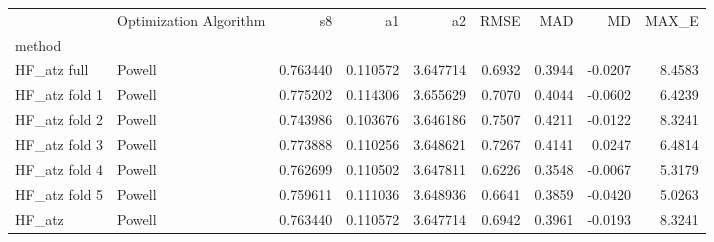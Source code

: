 \begin{tabular}{llrrrrrrr}
 & Optimization Algorithm & s8 & a1 & a2 & RMSE & MAD & MD & MAX_E \\
method &  &  &  &  &  &  &  &  \\
HF_atz full & Powell & 0.763440 & 0.110572 & 3.647714 & 0.6932 & 0.3944 & -0.0207 & 8.4583 \\
HF_atz fold 1 & Powell & 0.775202 & 0.114306 & 3.655629 & 0.7070 & 0.4044 & -0.0602 & 6.4239 \\
HF_atz fold 2 & Powell & 0.743986 & 0.103676 & 3.646186 & 0.7507 & 0.4211 & -0.0122 & 8.3241 \\
HF_atz fold 3 & Powell & 0.773888 & 0.110256 & 3.648621 & 0.7267 & 0.4141 & 0.0247 & 6.4814 \\
HF_atz fold 4 & Powell & 0.762699 & 0.110502 & 3.647811 & 0.6226 & 0.3548 & -0.0067 & 5.3179 \\
HF_atz fold 5 & Powell & 0.759611 & 0.111036 & 3.648936 & 0.6641 & 0.3859 & -0.0420 & 5.0263 \\
HF_atz & Powell & 0.763440 & 0.110572 & 3.647714 & 0.6942 & 0.3961 & -0.0193 & 8.3241 \\
\end{tabular}
